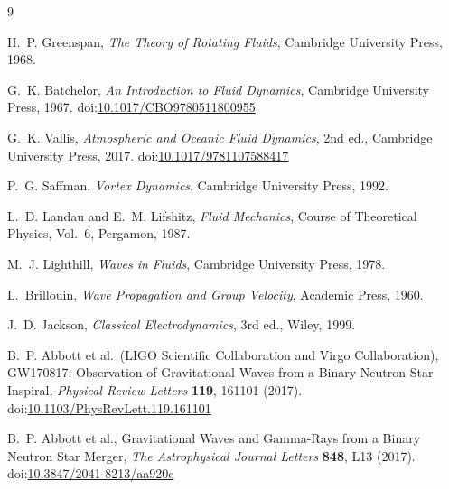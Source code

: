 \documentclass[12pt]{article}
\begin{document}
    
    \begin{thebibliography}{9}

        H.~P. Greenspan,
        \emph{The Theory of Rotating Fluids},
        Cambridge University Press, 1968.

        G.~K. Batchelor,
        \emph{An Introduction to Fluid Dynamics},
        Cambridge University Press, 1967.
        doi:\href{https://doi.org/10.1017/CBO9780511800955}{10.1017/CBO9780511800955}

        G.~K. Vallis,
        \emph{Atmospheric and Oceanic Fluid Dynamics}, 2nd ed.,
        Cambridge University Press, 2017.
        doi:\href{https://doi.org/10.1017/9781107588417}{10.1017/9781107588417}

        P.~G. Saffman,
        \emph{Vortex Dynamics},
        Cambridge University Press, 1992.

        L.~D. Landau and E.~M. Lifshitz,
        \emph{Fluid Mechanics},
        Course of Theoretical Physics, Vol.~6,
        Pergamon, 1987.

        M.~J. Lighthill,
        \emph{Waves in Fluids},
        Cambridge University Press, 1978.

        L.~Brillouin,
        \emph{Wave Propagation and Group Velocity},
        Academic Press, 1960.

        J.~D. Jackson,
        \emph{Classical Electrodynamics}, 3rd ed.,
        Wiley, 1999.

        B.~P. Abbott et al.\ (LIGO Scientific Collaboration and Virgo Collaboration),
        GW170817: Observation of Gravitational Waves from a Binary Neutron Star Inspiral,
        \emph{Physical Review Letters} \textbf{119}, 161101 (2017).
        doi:\href{https://doi.org/10.1103/PhysRevLett.119.161101}{10.1103/PhysRevLett.119.161101}

        B.~P. Abbott et al.,
        Gravitational Waves and Gamma-Rays from a Binary Neutron Star Merger,
        \emph{The Astrophysical Journal Letters} \textbf{848}, L13 (2017).
        doi:\href{https://doi.org/10.3847/2041-8213/aa920c}{10.3847/2041-8213/aa920c}

    \end{thebibliography}
\end{document}
